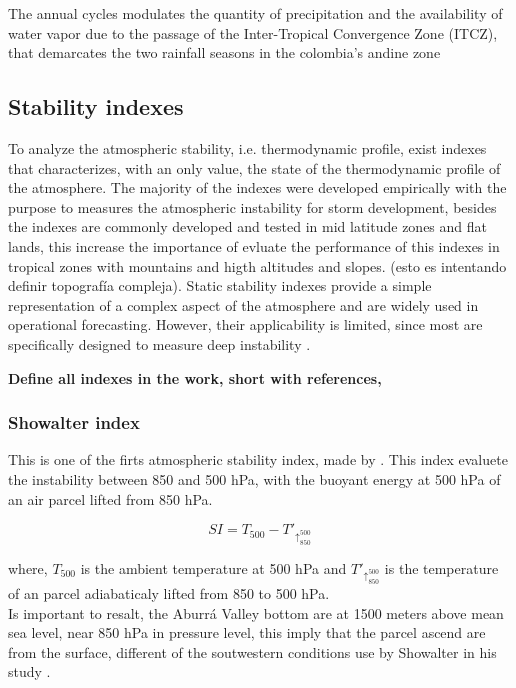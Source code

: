 \documentclass{ametsoc}
\begin{document}
The annual cycles modulates the quantity of precipitation and the availability of water vapor due to the passage of the Inter-Tropical Convergence Zone (ITCZ), that demarcates the two rainfall seasons in the colombia's andine zone 



\subsection{Stability indexes}

To analyze the atmospheric stability, i.e. thermodynamic profile, exist indexes that characterizes, with an only value, the state of the thermodynamic profile of the atmosphere. The majority of the indexes were developed empirically with the purpose to measures the atmospheric instability for storm development, besides the indexes are commonly developed and tested in mid latitude zones and flat lands, this increase the importance of evluate the performance of this indexes in tropical zones with mountains and higth altitudes and slopes. (esto es intentando definir topografía compleja). Static stability indexes provide a simple representation of a complex aspect of the atmosphere and are widely used in operational forecasting. However, their applicability is limited, since most are specifically designed to measure deep instability \citep{henry2000static}.

\textbf{Define all indexes in the work, short with references, }

\subsubsection{Showalter index}
This is one of the firts atmospheric stability index, made by \cite{showalter1953stability}. This index evaluete the instability between 850 and 500 hPa, with the buoyant energy at 500 hPa of an air parcel lifted from 850 hPa.


\begin{equation}
SI = T_{500} - T'_{\uparrow_{850}^{500} }
\label{eq:SI}
\end{equation}

where, $T_{500}$ is the ambient temperature at 500 hPa and $T'_{\uparrow_{850}^{500} }$ is the temperature of an parcel adiabaticaly lifted from 850 to 500 hPa.\\

Is important to resalt, the Aburrá Valley bottom are at 1500 meters above mean sea level, near 850 hPa in pressure level, this imply that the parcel ascend are from the surface, different of the soutwestern conditions use by Showalter in his study \citep{peppler1988review}.
\end{document}
